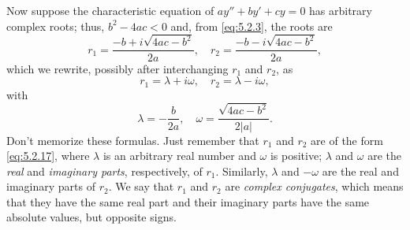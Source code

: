 Now suppose the characteristic equation of $ay''+by'+cy=0$ has arbitrary complex roots; thus,
$b^{2}-4ac<0$ and, from \eqref{eq:5.2.3}, the roots are
\[
  r_{1}=\frac{-b+i\sqrt{4ac-b^{2}}}{2a},\quad r_{2}= \frac{-b-i\sqrt{4ac-b^{2}}}{2a},
\]
which we rewrite, possibly after interchanging $r_{1}$ and $r_{2}$, as
\begin{equation}
  \label{eq:5.2.17}r_{1}=\lambda+i\omega,\quad r_{2}=\lambda-i\omega,
\end{equation}
with
\[
  \lambda=-\frac{b}{2a},\quad\omega=\frac{\sqrt{4ac-b^{2}}}{2|a|}.
\]
Don't memorize these formulas. Just remember that $r_{1}$ and $r_{2}$ are of the form
\eqref{eq:5.2.17}, where $\lambda$ is an arbitrary real number and $\omega$ is positive; $\lambda$
and $\omega$ are the {\color{blue}\it real\/} and {\color{blue}\it imaginary parts\/}, respectively,
of $r_{1}$. Similarly, $\lambda$ and $-\omega$ are the real and imaginary parts of $r_{2}$. We say
that $r_{1}$ and $r_{2}$ are {\color{blue}\it complex conjugates\/}, which means that they have the
same real part and their imaginary parts have the same absolute values, but opposite signs.

